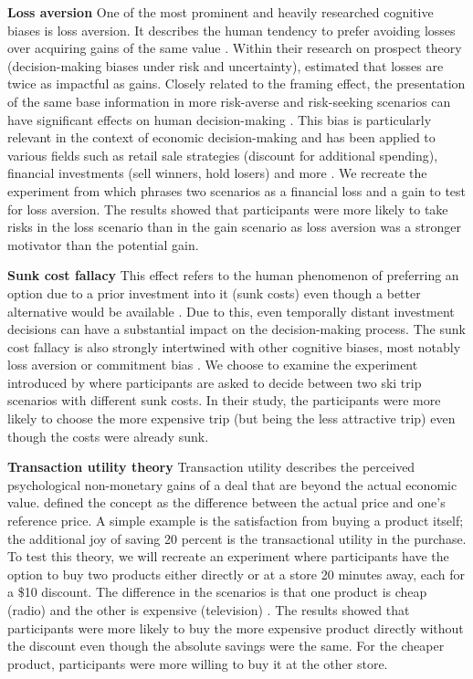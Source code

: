 \par \textbf{Loss aversion} One of the most prominent and heavily researched cognitive biases is loss aversion. It describes the human tendency to prefer avoiding losses over acquiring gains of the same value  \parencite{liu2023review}. Within their research on prospect theory (decision-making biases under risk and uncertainty), \textcite{tversky1992advances} estimated that losses are twice as impactful as gains. Closely related to the framing effect, the presentation of the same base information in more risk-averse and risk-seeking scenarios can have significant effects on human decision-making \parencite{druckman2001evaluating}. This bias is particularly relevant in the context of economic decision-making and has been applied to various fields such as retail sale strategies (discount for additional spending), financial investments (sell winners, hold losers) and more \parencite{liu2023review}. We recreate the experiment from \textcite{thaler2015misbehaving} which phrases two scenarios as a financial loss and a gain to test for loss aversion. The results showed that participants were more likely to take risks in the loss scenario than in the gain scenario as loss aversion was a stronger motivator than the potential gain.

\par \textbf{Sunk cost fallacy} This effect refers to the human phenomenon of preferring an option due to a prior investment into it (sunk costs) even though a better alternative would be available \parencite{arkes1985psychology}. Due to this, even temporally distant investment decisions can have a substantial impact on the decision-making process. The sunk cost fallacy is also strongly intertwined with other cognitive biases, most notably loss aversion or commitment bias \parencite{jarmolowicz2016sunk}. We choose to examine the experiment introduced by \textcite{arkes1985psychology} where participants are asked to decide between two ski trip scenarios with different sunk costs. In their study, the participants were more likely to choose the more expensive trip (but being the less attractive trip) even though the costs were already sunk.

\par \textbf{Transaction utility theory} Transaction utility describes the perceived psychological non-monetary gains of a deal that are beyond the actual economic value. \textcite{thaler1983transaction} defined the concept as the difference between the actual price and one's reference price. A simple example is the satisfaction from buying a product itself; the additional joy of saving 20 percent is the transactional utility in the purchase. To test this theory, we will recreate an experiment where participants have the option to buy two products either directly or at a store 20 minutes away, each for a \$10 discount. The difference in the scenarios is that one product is cheap (radio) and the other is expensive (television) \parencite{thaler1983transaction}. The results showed that participants were more likely to buy the more expensive product directly without the discount even though the absolute savings were the same. For the cheaper product, participants were more willing to buy it at the other store.

